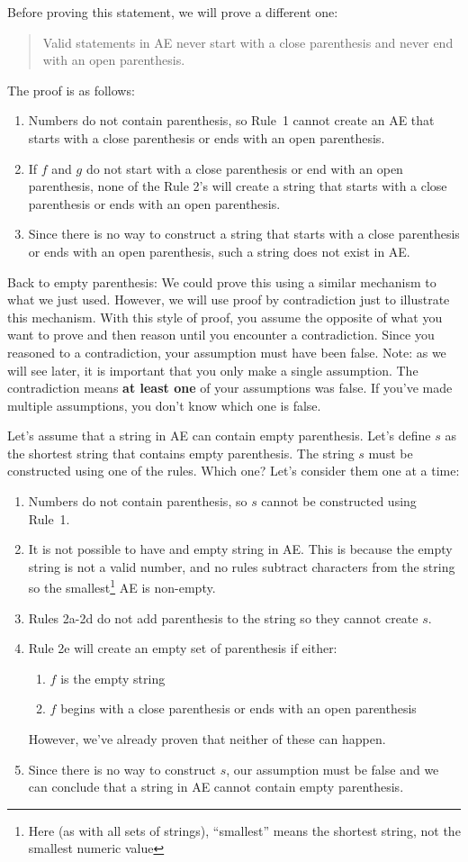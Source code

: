 \documentclass[letterpaper,12pt,openany,reqno]{book}%
\begin{document}
Before proving this statement, we will prove a different one:
\begin{quote}
Valid statements in AE never start with a close parenthesis and never end with an open parenthesis.
\end{quote}
The proof is as follows:
\begin{enumerate}
\item Numbers do not contain parenthesis, so Rule~1 cannot create an AE that starts with a close parenthesis or ends with an open parenthesis.
\item If $f$ and $g$ do not start with a close parenthesis or end with an open parenthesis, none of the Rule 2's will create a string that starts with a close parenthesis or ends with an open parenthesis.
\item Since there is no way to construct a string that starts with a close parenthesis or ends with an open parenthesis, such a string does not exist in AE.
\end{enumerate}

Back to empty parenthesis: We could prove this using a similar mechanism to what we just used. However, we will use proof by contradiction just to illustrate this mechanism. With this style of proof, you assume the opposite of what you want to prove and then reason until you encounter a contradiction. Since you reasoned to a contradiction, your assumption must have been false. Note: as we will see later, it is important that you only make a single assumption. The contradiction means \textbf{at least one} of your assumptions was false. If you've made multiple assumptions, you don't know which one is false.

Let's assume that a string in AE can contain empty parenthesis. Let's define $s$ as the shortest string that contains empty parenthesis. The string $s$ must be constructed using one of the rules. Which one? Let's consider them one at a time:
\begin{enumerate}
\item Numbers do not contain parenthesis, so $s$ cannot be constructed using Rule~1.
\item It is not possible to have and empty string in AE. This is because the empty string is not a valid number, and no rules subtract characters from the string so the smallest\footnote{Here (as with all sets of strings), ``smallest'' means the shortest string, not the smallest numeric value} AE is non-empty. 
\item Rules 2a-2d do not add parenthesis to the string so they cannot create $s$.
\item Rule 2e will create an empty set of parenthesis if either:
\begin{enumerate}
\item $f$ is the empty string 
\item $f$ begins with a close parenthesis or ends with an open parenthesis
\end{enumerate}
However, we've already proven that neither of these can happen.
\item Since there is no way to construct $s$, our assumption must be false and we can conclude that a string in AE cannot contain empty parenthesis.
\end{enumerate}
\end{document}
